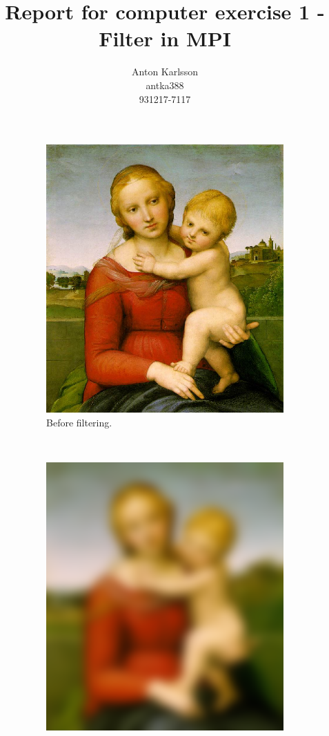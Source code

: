 \message{ !name(report.tex)}\documentclass[two column]{article}
\title{Report for computer exercise 1 - Filter in MPI}
\author{Anton Karlsson\\antka388\\931217-7117}
\date{}
\begin{document}
\begin{figure}[h]
  \centering
  \begin{subfigure}{0.3\textwidth}
    \includegraphics[width=\textwidth]{im1.png}
    \caption{Before filtering.}
  \end{subfigure}
  ~%
  \begin{subfigure}{0.3\textwidth}
    \includegraphics[width=\textwidth]{im1test.png}

\end{subfigure}
\end{figure}
\end{document}
